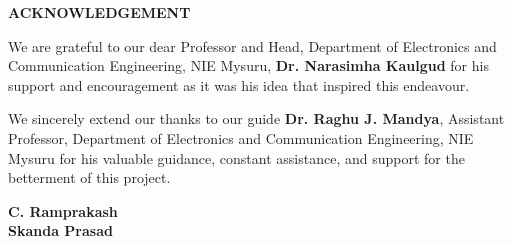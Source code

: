 \documentclass[./A14_Report.tex]{subfiles}
\begin{document}
\begin{center}
    \huge \textbf{ACKNOWLEDGEMENT}
\end{center}
\vspace{3cm}
We are grateful to our dear Professor and Head, Department of Electronics and
Communication Engineering, NIE Mysuru, \textbf{Dr.  Narasimha Kaulgud} for his
support and encouragement as it was his idea that inspired this endeavour.
\par
We sincerely extend our thanks to our guide \textbf{Dr. Raghu J. Mandya},
Assistant Professor, Department of Electronics and Communication Engineering,
NIE Mysuru for his valuable guidance, constant assistance, and support for the
betterment of this project.
\\
\begin{flushright}
    \textbf{C. Ramprakash}\\
    \textbf{Skanda Prasad}
\end{flushright}
\restoregeometry
\end{document}
